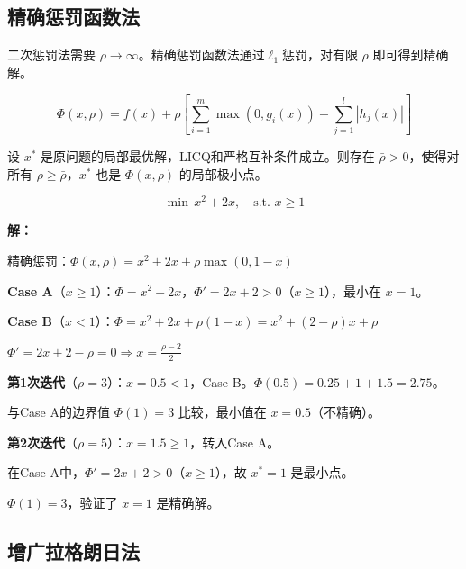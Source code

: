 \subsection{精确惩罚函数法}

\begin{conceptbox}[精确惩罚]
二次惩罚法需要 $\rho \to \infty$。精确惩罚函数法通过$\ell_1$惩罚，对有限 $\rho$ 即可得到精确解。
\end{conceptbox}

\begin{definition}
\[
\Phi(x, \rho) = f(x) + \rho\left[\sum_{i=1}^m \max(0, g_i(x)) + \sum_{j=1}^l |h_j(x)|\right]
\]
\end{definition}

\begin{theorem}[精确性]
设 $x^*$ 是原问题的局部最优解，LICQ和严格互补条件成立。则存在 $\bar{\rho} > 0$，使得对所有 $\rho \geq \bar{\rho}$，$x^*$ 也是 $\Phi(x, \rho)$ 的局部极小点。
\end{theorem}

\begin{example}
\[
\min \, x^2 + 2x, \quad \text{s.t. } x \geq 1
\]

\textbf{解：}

精确惩罚：$\Phi(x, \rho) = x^2 + 2x + \rho \max(0, 1-x)$

\textbf{Case A}（$x \geq 1$）：$\Phi = x^2 + 2x$，$\Phi' = 2x + 2 > 0$（$x \geq 1$），最小在 $x = 1$。

\textbf{Case B}（$x < 1$）：$\Phi = x^2 + 2x + \rho(1-x) = x^2 + (2-\rho)x + \rho$

$\Phi' = 2x + 2 - \rho = 0 \Rightarrow x = \frac{\rho - 2}{2}$

\textbf{第1次迭代}（$\rho = 3$）：$x = 0.5 < 1$，Case B。$\Phi(0.5) = 0.25 + 1 + 1.5 = 2.75$。

与Case A的边界值 $\Phi(1) = 3$ 比较，最小值在 $x = 0.5$（不精确）。

\textbf{第2次迭代}（$\rho = 5$）：$x = 1.5 \geq 1$，转入Case A。

在Case A中，$\Phi' = 2x + 2 > 0$（$x \geq 1$），故 $x^* = 1$ 是最小点。

$\Phi(1) = 3$，验证了 $x = 1$ 是精确解。
\end{example}

\subsection{增广拉格朗日法}

